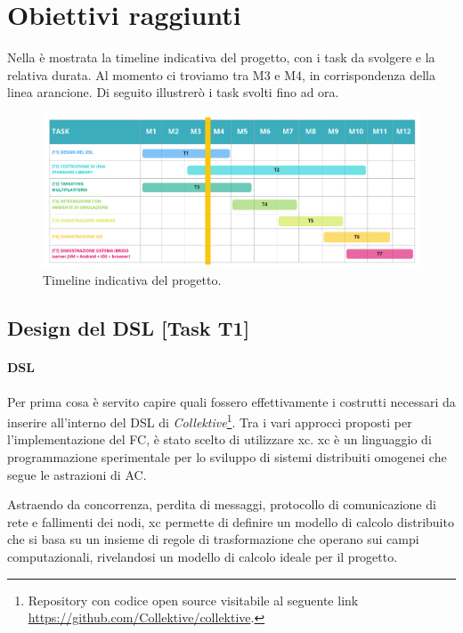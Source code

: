 \documentclass[13pt, a4paper]{article}
\newcommand{\ck}{\emph{Collektive}}
\begin{document}
\section{Obiettivi raggiunti}\label{sec:obiettivi-raggiunti}

Nella  è mostrata la timeline indicativa del progetto, con i task da svolgere e la relativa durata.
%
Al momento ci troviamo tra M3 e M4, in corrispondenza della linea arancione.
%
Di seguito illustrerò i task svolti fino ad ora.

\begin{figure}
    \centering
    \includegraphics[width=\textwidth]{images/collektive_timeline}
    \caption{Timeline indicativa del progetto.}
    \label{fig:timeline}
\end{figure}

\subsection{Design del DSL [Task T1]}\label{subsec:t1}

\paragraph{DSL}
Per prima cosa è servito capire quali fossero effettivamente i costrutti necessari da inserire all'interno del DSL di \ck{}\footnote{
    Repository con codice open source visitabile al seguente link \url{https://github.com/Collektive/collektive}.
}.
%
Tra i vari approcci proposti per l'implementazione del \ac{FC}, è stato scelto di utilizzare \ac{xc}.
%
\ac{xc} è un linguaggio di programmazione sperimentale per lo sviluppo di sistemi distribuiti omogenei che segue le astrazioni
    di \ac{AC}.

Astraendo da concorrenza, perdita di messaggi, protocollo di comunicazione di rete e fallimenti dei nodi,
    \ac{xc} permette di definire un modello di calcolo distribuito che si basa su un insieme di regole di trasformazione
    che operano sui campi computazionali,
    rivelandosi un modello di calcolo ideale per il progetto.
\end{document}
